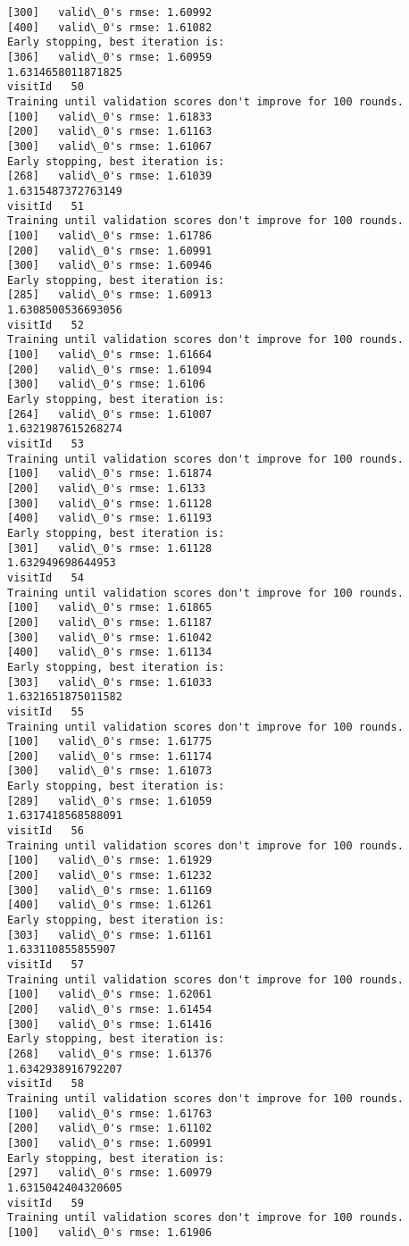 \documentclass[11pt]{article}
\begin{document}
\begin{Verbatim}[commandchars=\\\{\}]
[300]	valid\_0's rmse: 1.60992
[400]	valid\_0's rmse: 1.61082
Early stopping, best iteration is:
[306]	valid\_0's rmse: 1.60959
1.6314658011871825
visitId   50
Training until validation scores don't improve for 100 rounds.
[100]	valid\_0's rmse: 1.61833
[200]	valid\_0's rmse: 1.61163
[300]	valid\_0's rmse: 1.61067
Early stopping, best iteration is:
[268]	valid\_0's rmse: 1.61039
1.6315487372763149
visitId   51
Training until validation scores don't improve for 100 rounds.
[100]	valid\_0's rmse: 1.61786
[200]	valid\_0's rmse: 1.60991
[300]	valid\_0's rmse: 1.60946
Early stopping, best iteration is:
[285]	valid\_0's rmse: 1.60913
1.6308500536693056
visitId   52
Training until validation scores don't improve for 100 rounds.
[100]	valid\_0's rmse: 1.61664
[200]	valid\_0's rmse: 1.61094
[300]	valid\_0's rmse: 1.6106
Early stopping, best iteration is:
[264]	valid\_0's rmse: 1.61007
1.6321987615268274
visitId   53
Training until validation scores don't improve for 100 rounds.
[100]	valid\_0's rmse: 1.61874
[200]	valid\_0's rmse: 1.6133
[300]	valid\_0's rmse: 1.61128
[400]	valid\_0's rmse: 1.61193
Early stopping, best iteration is:
[301]	valid\_0's rmse: 1.61128
1.632949698644953
visitId   54
Training until validation scores don't improve for 100 rounds.
[100]	valid\_0's rmse: 1.61865
[200]	valid\_0's rmse: 1.61187
[300]	valid\_0's rmse: 1.61042
[400]	valid\_0's rmse: 1.61134
Early stopping, best iteration is:
[303]	valid\_0's rmse: 1.61033
1.6321651875011582
visitId   55
Training until validation scores don't improve for 100 rounds.
[100]	valid\_0's rmse: 1.61775
[200]	valid\_0's rmse: 1.61174
[300]	valid\_0's rmse: 1.61073
Early stopping, best iteration is:
[289]	valid\_0's rmse: 1.61059
1.6317418568588091
visitId   56
Training until validation scores don't improve for 100 rounds.
[100]	valid\_0's rmse: 1.61929
[200]	valid\_0's rmse: 1.61232
[300]	valid\_0's rmse: 1.61169
[400]	valid\_0's rmse: 1.61261
Early stopping, best iteration is:
[303]	valid\_0's rmse: 1.61161
1.633110855855907
visitId   57
Training until validation scores don't improve for 100 rounds.
[100]	valid\_0's rmse: 1.62061
[200]	valid\_0's rmse: 1.61454
[300]	valid\_0's rmse: 1.61416
Early stopping, best iteration is:
[268]	valid\_0's rmse: 1.61376
1.6342938916792207
visitId   58
Training until validation scores don't improve for 100 rounds.
[100]	valid\_0's rmse: 1.61763
[200]	valid\_0's rmse: 1.61102
[300]	valid\_0's rmse: 1.60991
Early stopping, best iteration is:
[297]	valid\_0's rmse: 1.60979
1.6315042404320605
visitId   59
Training until validation scores don't improve for 100 rounds.
[100]	valid\_0's rmse: 1.61906

\end{Verbatim}
\end{document}
